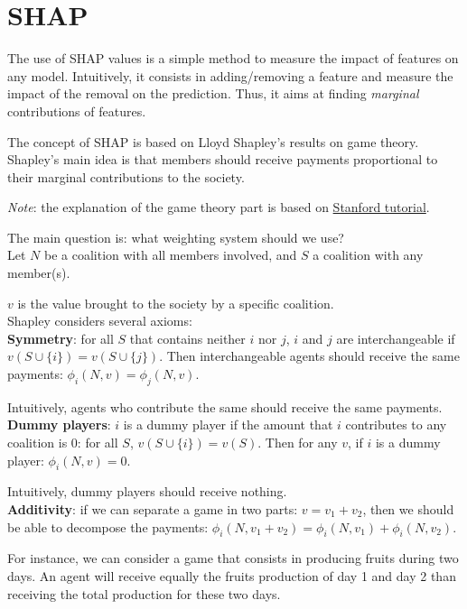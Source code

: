\section*{SHAP}

The use of SHAP values is a simple method to measure the impact of features on any model. Intuitively, it consists in adding/removing a feature and measure the impact of the removal on the prediction. Thus, it aims at finding \textit{marginal} contributions of features. 

The concept of SHAP is based on Lloyd Shapley's results on game theory. Shapley's main idea is that members should receive payments proportional to their marginal contributions to the society. 

\textit{Note}: the explanation of the game theory part is based on \href{https://www.youtube.com/watch?v=qcLZMYPdpH4}{Stanford tutorial}.

The main question is: what weighting system should we use? \\

Let $N$ be a coalition with all members involved, and $S$ a coalition with any member(s).

$v$ is the value brought to the society by a specific coalition. \\

Shapley considers several axioms: \\

\textbf{Symmetry}: for all $S$ that contains neither $i$ nor $j$, $i$ and $j$ are interchangeable if $v(S \cup \{i\})=v(S \cup \{j\})$. Then interchangeable agents should receive the same payments: $\phi_i(N,v)=\phi_j(N,v)$.

Intuitively, agents who contribute the same should receive the same payments. \\

\textbf{Dummy players}: $i$ is a dummy player if the amount that $i$ contributes to any coalition is $0$: for all $S$, $v(S \cup \{i\})=v(S)$. Then for any $v$, if $i$ is a dummy player: $\phi_i(N,v)=0$.

Intuitively, dummy players should receive nothing. \\

\textbf{Additivity}: if we can separate a game in two parts: $v=v_1 + v_2$, then we should be able to decompose the payments: $\phi_i(N, v_1+v_2) = \phi_i(N, v_1) + \phi_i(N, v_2)$.

For instance, we can consider a game that consists in producing fruits during two days. An agent will receive equally the fruits production of day 1 and day 2 than receiving the total production for these two days. \\


